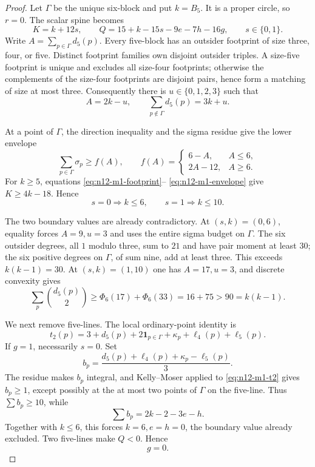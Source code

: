\begin{proof}
Let $\Gamma$ be the unique six-block and put $k=B_5$.  It is a proper
circle, so $r=0$.  The scalar spine becomes
\begin{equation}\label{eq:n12-m1-spine}
K=k+12s,\qquad Q=15+k-15s-9e-7h-16g,\qquad s\in\{0,1\}.
\end{equation}
Write $A=\sum_{p\in\Gamma}d_5(p)$.  Every five-block has an outsider
footprint of size three, four, or five.  Distinct footprint families own
disjoint outsider triples.  A size-five footprint is unique and excludes
all size-four footprints; otherwise the complements of the size-four
footprints are disjoint pairs, hence form a matching of size at most three.
Consequently there is $u\in\{0,1,2,3\}$ such that
\begin{equation}\label{eq:n12-m1-footprint}
A=2k-u,\qquad \sum_{p\notin\Gamma}d_5(p)=3k+u.
\end{equation}

At a point of $\Gamma$, the direction inequality and the sigma residue
give the lower envelope
\begin{equation}\label{eq:n12-m1-envelope}
\sum_{p\in\Gamma}\sigma_p\ge f(A),\qquad
f(A)=\begin{cases}6-A,&A\le6,\\2A-12,&A\ge6.
\end{cases}
\end{equation}
For $k\ge5$, equations \eqref{eq:n12-m1-footprint}--
\eqref{eq:n12-m1-envelope} give $K\ge4k-18$.  Hence
\begin{equation}\label{eq:n12-m1-kcaps}
s=0\Rightarrow k\le6,\qquad s=1\Rightarrow k\le10.
\end{equation}

The two boundary values are already contradictory.  At $(s,k)=(0,6)$,
equality forces $A=9,u=3$ and uses the entire sigma budget on $\Gamma$.
The six outsider degrees, all $1$ modulo three, sum to $21$ and have pair
moment at least $30$; the six positive degrees on $\Gamma$, of sum nine,
add at least three.  This exceeds $k(k-1)=30$.  At $(s,k)=(1,10)$ one has
$A=17,u=3$, and discrete convexity gives
\[
 \sum_p\binom{d_5(p)}2
 \ge\Phi_6(17)+\Phi_6(33)=16+75>90=k(k-1).
\]

We next remove five-lines.  The local ordinary-point identity is
\begin{equation}\label{eq:n12-m1-t2}
t_2(p)=3+d_5(p)+2\mathbf1_{p\in\Gamma}+\kappa_p
       +\ell_4(p)+\ell_5(p).
\end{equation}
If $g=1$, necessarily $s=0$.  Set
\[
b_p=\frac{d_5(p)+\ell_4(p)+\kappa_p-\ell_5(p)}3.
\]
The residue makes $b_p$ integral, and Kelly--Moser applied to
\eqref{eq:n12-m1-t2} gives $b_p\ge1$, except possibly at the at most two
points of $\Gamma$ on the five-line.  Thus $\sum b_p\ge10$, while
\[
 \sum b_p=2k-2-3e-h.
\]
Together with $k\le6$, this forces $k=6,e=h=0$, the boundary value already
excluded.  Two five-lines make $Q<0$.  Hence
\begin{equation}\label{eq:n12-m1-gzero}g=0.\end{equation}


\end{proof}
